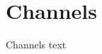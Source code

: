 
\section{Channels}\fbeg{}\begin{frame}{}

{\fontsize{20}{23}\selectfont

Channels text

}

\end{frame}

